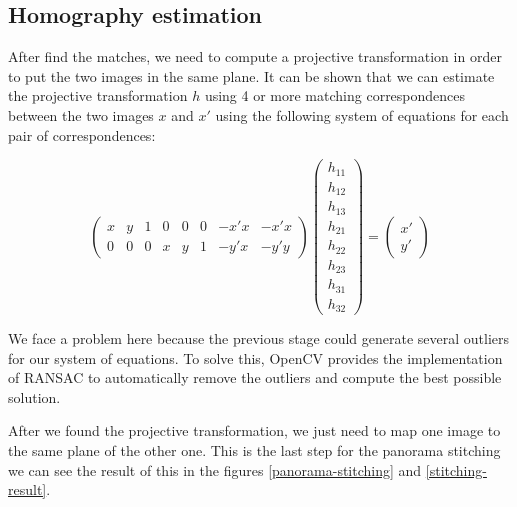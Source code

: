 \documentclass[journal]{IEEEtran}
\begin{document}
\subsection{Homography estimation}

After find the matches, we need to compute a projective transformation
in order to put the two images in the same plane. It can be shown that we
can estimate the projective transformation $h$ using 4 or more matching
correspondences between the two images $x$ and $x'$ using the following
system of equations for each pair of correspondences:

\[
\begin{pmatrix}
  x & y & 1 & 0 & 0 & 0 & -x'x & -x'x \\
  0 & 0 & 0 & x & y & 1 & -y'x & -y'y
\end{pmatrix}
\begin{pmatrix}
  h_{11} \\
  h_{12} \\
  h_{13} \\
  h_{21} \\
  h_{22} \\
  h_{23} \\
  h_{31} \\
  h_{32}
\end{pmatrix}
 = \begin{pmatrix}
  x' \\
  y'
\end{pmatrix}
\]

We face a problem here because the previous stage could generate several
outliers for our system of equations. To solve this, OpenCV provides
the implementation of RANSAC \cite{wiki:ransac} to automatically remove
the outliers and compute the best possible solution.

After we found the projective transformation, we just need to map one image to
the same plane of the other one. This is the last step for the panorama
stitching we can see the result of this in the figures \ref{panorama-stitching}
and \ref{stitching-result}.
\end{document}

